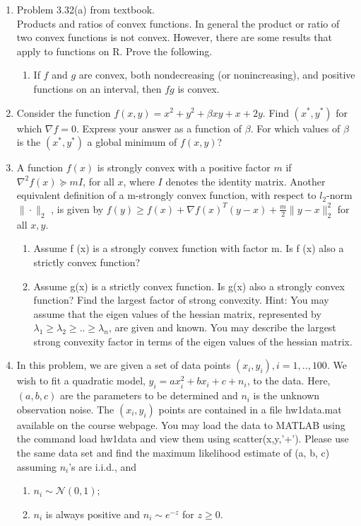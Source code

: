 \documentclass[12pt,letter]{article}
\newcommand{\norm}[1]{\|#1\|}
\begin{document}
\begin{enumerate}
\item Problem 3.32(a) from textbook.\\
  Products and ratios of convex functions. In general the product or ratio of two convex functions is not convex. However, there are some results that apply to functions on R. Prove the following.
  \begin{enumerate}
  \item If $f$ and $g$ are convex, both nondecreasing (or nonincreasing), and positive functions on an interval, then $fg$ is convex.
  \end{enumerate}

\item Consider the function $f(x, y) = x^2 + y^2 + \beta x y + x + 2y$. Find $(x^* , y^* )$ for which $\nabla f = 0$. Express your answer as a function of $\beta$. For which values of $\beta$ is the $(x^* , y^* )$ a global minimum of $f(x, y)$?
\item A function $f(x)$ is strongly convex with a positive factor $m$ if $\nabla^2 f(x) \succeq mI$, for all $x$, where $I$ denotes the identity matrix. Another equivalent definition of a m-strongly convex function, with respect to $l_2$-norm $\norm{\cdot}_2$ , is given by $f (y) \geq f(x)+\nabla f (x)^T (y−x) + \frac{m}{2}\norm{y-x}_2^2$ for all $x, y$.
  \begin{enumerate}
  \item Assume f (x) is a strongly convex function with factor m. Is f (x) also a strictly convex function?
  \item Assume g(x) is a strictly convex function. Is g(x) also a strongly convex function?
    Find the largest factor of strong convexity.
    Hint: You may assume that the eigen values of the hessian matrix, represented by $\lambda_1 \geq
\lambda_2 \geq .. \geq \lambda_n$, are given and known. You may describe the largest strong convexity factor in terms of the eigen values of the hessian matrix.
  \end{enumerate}
\item In this problem, we are given a set of data points $(x_i, y_i ), i=1,..,100$. We wish to fit a quadratic model, $y_i = ax_i^2 + bx_i + c + n_i$, to the data. Here, $(a, b, c)$ are the parameters to be determined and $n_i$ is the unknown observation noise. The $(x_i, y_i)$ points are contained
in a file hw1data.mat available on the course webpage. You may load the data to MATLAB
using the command load hw1data and view them using scatter(x,y,'+'). Please use
the same data set and find the maximum likelihood estimate of (a, b, c) assuming $n_i$'s are
i.i.d., and
\begin{enumerate}
\item $n_i \sim \mathcal{N}(0, 1)$;
\item $n_i$ is always positive and $n_i \sim e^{-z}$ for $z \geq 0$.
\end{enumerate}

\end{enumerate}
\end{document}

